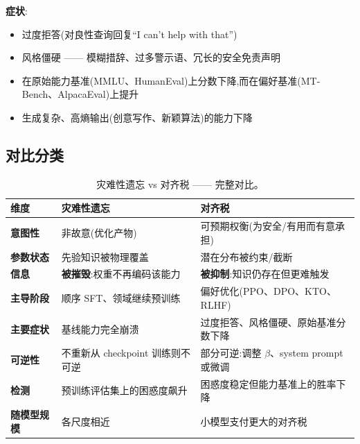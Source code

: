\textbf{症状}:

\begin{itemize}
  \item 过度拒答(对良性查询回复“I can't help with that”)
  \item 风格僵硬 —— 模糊措辞、过多警示语、冗长的安全免责声明
  \item 在原始能力基准(MMLU、HumanEval)上分数下降,而在偏好基准(MT-Bench、AlpacaEval)上提升
  \item 生成复杂、高熵输出(创意写作、新颖算法)的能力下降
\end{itemize}

\subsection{对比分类}
\label{comparative-taxonomy}

\begin{table}[ht!]
\centering\small
\caption{灾难性遗忘 vs 对齐税 —— 完整对比。}
\noindent\begin{tabularx}{\linewidth}{@{}l Z{0.91} Z{1.09}@{}}
\toprule
\textbf{维度} & \textbf{灾难性遗忘} & \textbf{对齐税} \\
\midrule
\textbf{意图性} & 非故意(优化产物) & 可预期权衡(为安全/有用而有意承担) \\
\textbf{参数状态} & 先验知识被物理覆盖 & 潜在分布被约束/截断 \\
\textbf{信息} & \textbf{被摧毁}:权重不再编码该能力 & \textbf{被抑制}:知识仍存在但更难触发 \\
\textbf{主导阶段} & 顺序 SFT、领域继续预训练 & 偏好优化(PPO、DPO、KTO、RLHF) \\
\textbf{主要症状} & 基线能力完全崩溃 & 过度拒答、风格僵硬、原始基准分数下降 \\
\textbf{可逆性} & 不重新从 checkpoint 训练则不可逆 & 部分可逆:调整 $\beta$、system prompt 或微调 \\
\textbf{检测} & 预训练评估集上的困惑度飙升 & 困惑度稳定但能力基准上的胜率下降 \\
\textbf{随模型规模} & 各尺度相近 & 小模型支付更大的对齐税 \\
\bottomrule
\end{tabularx}
\end{table}

